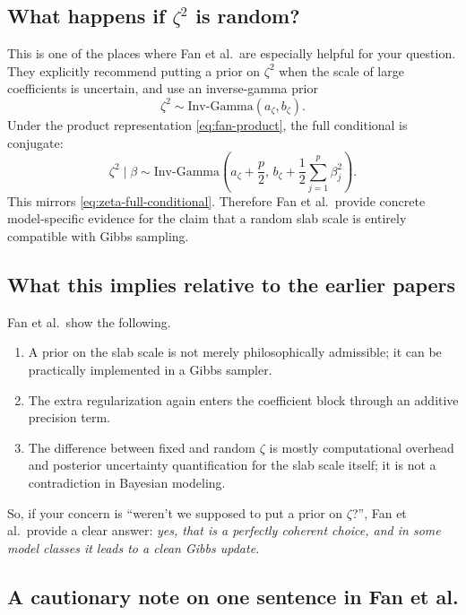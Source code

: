 \documentclass[11pt]{article}
\newcommand{\IG}{\mathrm{Inv\mbox{-}Gamma}}
\begin{document}
\subsection{What happens if $\zeta^2$ is random?}

This is one of the places where Fan et al.\ are especially helpful for your question. They explicitly recommend putting a prior on $\zeta^2$ when the scale of large coefficients is uncertain, and use an inverse-gamma prior
\begin{equation}
\zeta^2 \sim \IG(a_\zeta,b_\zeta).
\label{eq:fan-b-prior}
\end{equation}
Under the product representation \eqref{eq:fan-product}, the full conditional is conjugate:
\begin{equation}
\zeta^2 \mid \beta
\sim
\IG\!\left(a_\zeta+\frac{p}{2},\, b_\zeta+\frac{1}{2}\sum_{j=1}^p \beta_j^2\right).
\label{eq:fan-b-update}
\end{equation}
This mirrors \eqref{eq:zeta-full-conditional}. Therefore Fan et al.\ provide concrete model-specific evidence for the claim that a random slab scale is entirely compatible with Gibbs sampling.

\subsection{What this implies relative to the earlier papers}

Fan et al.\ show the following.

\begin{enumerate}
\item A prior on the slab scale is not merely philosophically admissible; it can be practically implemented in a Gibbs sampler.
\item The extra regularization again enters the coefficient block through an additive precision term.
\item The difference between fixed and random $\zeta$ is mostly computational overhead and posterior uncertainty quantification for the slab scale itself; it is not a contradiction in Bayesian modeling.
\end{enumerate}

So, if your concern is ``weren't we supposed to put a prior on $\zeta$?'', Fan et al.\ provide a clear answer: \emph{yes, that is a perfectly coherent choice, and in some model classes it leads to a clean Gibbs update.}

\subsection{A cautionary note on one sentence in Fan et al.}
\end{document}
